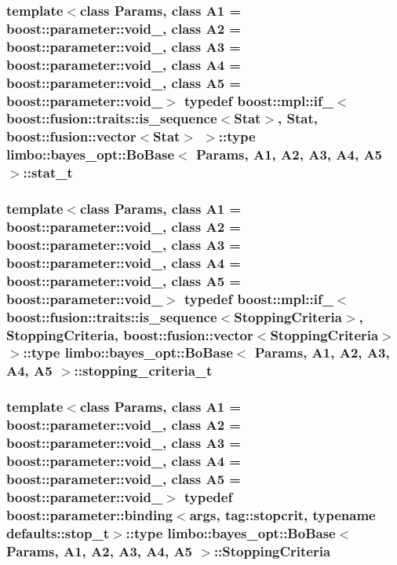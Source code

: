 \subsubsection[{stat\+\_\+t}]{\setlength{\rightskip}{0pt plus 5cm}template$<$class Params, class A1 = boost\+::parameter\+::void\+\_\+, class A2 = boost\+::parameter\+::void\+\_\+, class A3 = boost\+::parameter\+::void\+\_\+, class A4 = boost\+::parameter\+::void\+\_\+, class A5 = boost\+::parameter\+::void\+\_\+$>$ typedef boost\+::mpl\+::if\+\_\+$<$boost\+::fusion\+::traits\+::is\+\_\+sequence$<${\bf Stat}$>$, {\bf Stat}, boost\+::fusion\+::vector$<${\bf Stat}$>$ $>$\+::type {\bf limbo\+::bayes\+\_\+opt\+::\+Bo\+Base}$<$ Params, A1, A2, A3, A4, A5 $>$\+::{\bf stat\+\_\+t}}\label{classlimbo_1_1bayes__opt_1_1_bo_base_a67aac9bd22ae3de346afe7ffe5b564d3}
\hypertarget{classlimbo_1_1bayes__opt_1_1_bo_base_ad045a21de8950f3671f6b156f2271e44}{}
\subsubsection[{stopping\+\_\+criteria\+\_\+t}]{\setlength{\rightskip}{0pt plus 5cm}template$<$class Params, class A1 = boost\+::parameter\+::void\+\_\+, class A2 = boost\+::parameter\+::void\+\_\+, class A3 = boost\+::parameter\+::void\+\_\+, class A4 = boost\+::parameter\+::void\+\_\+, class A5 = boost\+::parameter\+::void\+\_\+$>$ typedef boost\+::mpl\+::if\+\_\+$<$boost\+::fusion\+::traits\+::is\+\_\+sequence$<${\bf Stopping\+Criteria}$>$, {\bf Stopping\+Criteria}, boost\+::fusion\+::vector$<${\bf Stopping\+Criteria}$>$ $>$\+::type {\bf limbo\+::bayes\+\_\+opt\+::\+Bo\+Base}$<$ Params, A1, A2, A3, A4, A5 $>$\+::{\bf stopping\+\_\+criteria\+\_\+t}}\label{classlimbo_1_1bayes__opt_1_1_bo_base_ad045a21de8950f3671f6b156f2271e44}
\hypertarget{classlimbo_1_1bayes__opt_1_1_bo_base_ac9ab3f37c746dcf70ef7096a89dd1b6c}{}
\subsubsection[{Stopping\+Criteria}]{\setlength{\rightskip}{0pt plus 5cm}template$<$class Params, class A1 = boost\+::parameter\+::void\+\_\+, class A2 = boost\+::parameter\+::void\+\_\+, class A3 = boost\+::parameter\+::void\+\_\+, class A4 = boost\+::parameter\+::void\+\_\+, class A5 = boost\+::parameter\+::void\+\_\+$>$ typedef boost\+::parameter\+::binding$<${\bf args}, tag\+::stopcrit, typename {\bf defaults\+::stop\+\_\+t}$>$\+::type {\bf limbo\+::bayes\+\_\+opt\+::\+Bo\+Base}$<$ Params, A1, A2, A3, A4, A5 $>$\+::{\bf Stopping\+Criteria}}\label{classlimbo_1_1bayes__opt_1_1_bo_base_ac9ab3f37c746dcf70ef7096a89dd1b6c}


